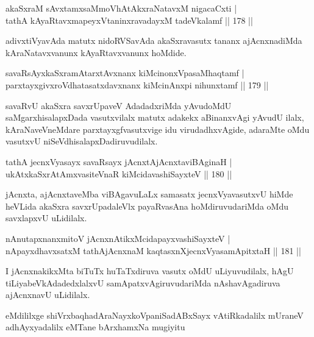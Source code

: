 \begin{shl}
akaSxraM sAvxtamxsaMmoVhAtAkxraNatavxM nigacaCxti |\\
tathA kAyaRtavxmapeyxVtaninxravadayxM tadeVkalamf \hfill || 178 ||
\end{shl}

\begin{artha}
adivxtiVyavAda matutx nidoRVSavAda akaSxravasutx tananx ajAcnxnadiMda kAraNatavxvanunx kAyaRtavxvanunx hoMdide.
\end{artha}

\begin{shl}
savaRsAyxkaSxramAtarxtAvxnanx kiMcinonxVpasaMhaqtamf |\\
parxtayxgivxroVdhatasatxdavxnanx kiMcinAnxpi nihunxtamf \hfill || 179 ||
\end{shl}

\begin{artha}
savaRvU akaSxra savxrUpaveV AdadadxriMda yAvudoMdU saMgarxhisalapxDada vasutxvilalx matutx adakekx aBinanxvAgi yAvudU ilalx, kAraNaveVneMdare parxtayxgfvasutxvige idu virudadhxvAgide, adaraMte oMdu vasutxvU niSeVdhisalapxDadiruvudilalx.
\end{artha}%

\begin{shl}
tathA jecnxVyasayx savaRsayx jAcnxtAjAcnxtaviBAginaH |\\
ukAtxkaSxrAtAmxvasiteVnaR kiMcidavashiSayxteV \hfill || 180 ||
\end{shl}

\begin{artha}
jAcnxta, ajAcnxtaveMba viBAgavuLaLx samasatx jecnxVyavasutxvU hiMde heVLida akaSxra savxrUpadaleVlx payaRvasAna hoMdiruvudariMda oMdu savxlapxvU uLidilalx.
\end{artha}

\begin{shl}
nAnutapxnanxmitoV jAcnxnAtikxMcidapayxvashiSayxteV |\\
nApayxdhavxsatxM tathA\s jAcnxnaM kaqtasxnXjecnxVyasamApitxtaH \hfill || 181 ||
\end{shl}

\begin{artha}
I jAcnxnakikxMta biTuTx huTaTxdiruva vasutx oMdU uLiyuvudilalx, hAgU tiLiyabeVkAdadedxlalxvU samApatxvAgiruvudariMda nAshavAgadiruva ajAcnxnavU uLidilalx.
\end{artha}

\begin{center}
eMdililxge shiVrxbaqhadAraNayxkoVpaniSadABxSayx vAtiRkadalilx mUraneV adhAyxyadalilx eMTane bArxhamxNa mugiyitu
\end{center}
